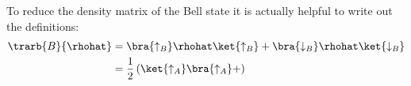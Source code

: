 To reduce the density matrix of the Bell state it is actually helpful to write out the definitions:
\begin{align}
\trarb{B}{\rhohat} &= \bra{\uparrow_B}\rhohat\ket{\uparrow_B}+\bra{\downarrow_B}\rhohat\ket{\downarrow_B}\\
&=\frac{1}{2}\left(\ket{\uparrow_A}\bra{\uparrow_A}+\right)
\end{align}